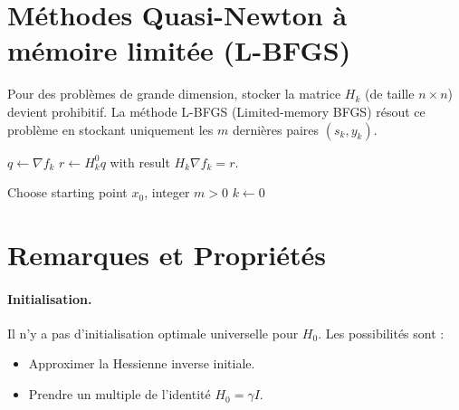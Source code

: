 \section{Méthodes Quasi-Newton à mémoire limitée (L-BFGS)}
\label{sec:lbfgs}

Pour des problèmes de grande dimension, stocker la matrice $H_k$ (de taille $n \times n$) devient prohibitif.
La méthode L-BFGS (Limited-memory BFGS) résout ce problème en stockant uniquement les $m$ dernières paires $(s_k, y_k)$.

\begin{algorithm}[H]
\caption{L-BFGS récursion à deux boucles}
\label{alg:lbfgs-twoloop}
$q \leftarrow \nabla f_k$\;
$r \leftarrow H_k^0 q$\;
\Stop with result $H_k \nabla f_k = r$.
\end{algorithm}

\begin{algorithm}[H]
\caption{L-BFGS}
\label{alg:lbfgs}
Choose starting point $x_0$, integer $m > 0$\;
$k \leftarrow 0$\;
\end{algorithm}

\section{Remarques et Propriétés}

\paragraph{Initialisation.} Il n'y a pas d'initialisation optimale universelle pour $H_0$.
Les possibilités sont :
\begin{itemize}
    \item Approximer la Hessienne inverse initiale.
    \item Prendre un multiple de l'identité $H_0 = \gamma I$.
\end{itemize}

